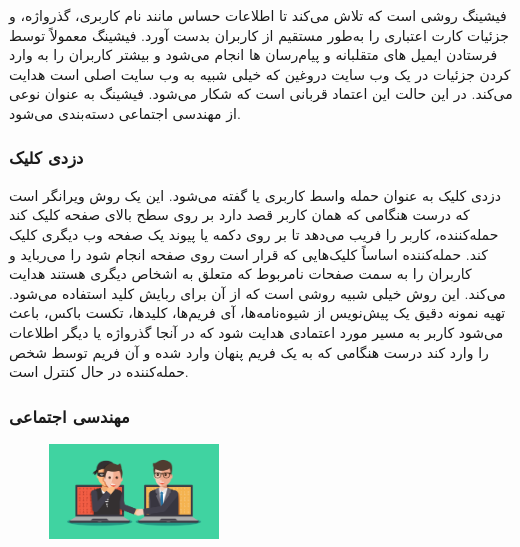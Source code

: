 \documentclass[12pt]{book}
\begin{document}
فیشینگ روشی است که تلاش می‌کند تا اطلاعات حساس مانند نام کاربری، گذرواژه، و جزئیات کارت اعتباری را به‌طور مستقیم از کاربران بدست آورد. فیشینگ معمولاً توسط فرستادن ایمیل های متقلبانه و پیام‌رسان ها انجام می‌شود و بیشتر کاربران را به وارد کردن جزئیات در یک وب سایت دروغین که خیلی شبیه به وب سایت اصلی است هدایت می‌کند. در این حالت این اعتماد قربانی است که شکار می‌شود. فیشینگ به عنوان نوعی از مهندسی اجتماعی دسته‌بندی می‌شود. 


\subsubsection{دزدی کلیک}

دزدی کلیک به عنوان حمله واسط کاربری یا
 گفته می‌شود. این یک روش ویرانگر است که درست هنگامی که همان کاربر قصد دارد بر روی سطح بالای صفحه کلیک کند حمله‌کننده، کاربر را فریب می‌دهد تا بر روی دکمه یا پیوند یک صفحه وب دیگری کلیک کند. حمله‌کننده اساساً کلیک‌هایی که قرار است روی صفحه انجام شود را می‌رباید و کاربران را به سمت صفحات نامربوط که متعلق به اشخاص دیگری هستند هدایت می‌کند. این روش خیلی شبیه روشی است که از آن برای ربایش کلید استفاده می‌شود. تهیه نمونه دقیق یک پیش‌نویس از شیوه‌نامه‌ها، آی فریم‌ها، کلیدها، تکست باکس، باعث می‌شود کاربر به مسیر مورد اعتمادی هدایت شود که در آنجا گذرواژه یا دیگر اطلاعات را وارد کند درست هنگامی که به یک فریم پنهان وارد شده و آن فریم توسط شخص حمله‌کننده در حال کنترل است. 

\subsubsection{
مهندسی اجتماعی
}

\begin{figure}
  \vspace{-20pt}
  \begin{center}
    \includegraphics[width=0.4\textwidth]{./csm_socialengineering_grn_a5d92ecb20.png}
  \end{center}
  \vspace{-20pt}
  \caption{}
  \vspace{-10pt}
\end{figure}
\end{document}
